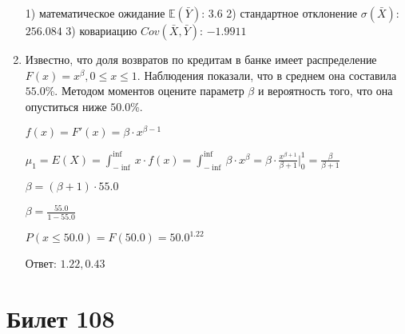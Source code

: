 \documentclass[a4paper,12pt]{article}
\begin{document}
\begin{enumerate}
1) математическое ожидание $\mathbb{E}(\bar Y)$: $3.6$ 
2) стандартное отклонение $\sigma(\bar X)$: $256.084$
3) ковариацию $Cov(\bar X, \bar Y)$: $-1.9911$


\item

    
	Известно, что доля возвратов по кредитам в банке имеет распределение $F(x) = x^{\beta}, 0 \le x \le 1$. Наблюдения показали, что в среднем она составила $55.0$\%. Методом моментов оцените параметр $\beta$ и вероятность того, что она опуститься ниже $50.0$\%.
	


	

	$f(x) = F'(x) = \beta \cdot x^{\beta - 1}$

	$\mu_{1} = E(X) = \int_{-\inf}^{\inf}x \cdot f(x) = \int_{-\inf}^{\inf} \beta \cdot x^{\beta} = \beta \cdot \frac{x^{\beta + 1}}{\beta + 1}\bigg|_0^1 = \frac{\beta}{\beta + 1}$

	$\beta = (\beta + 1) \cdot 55.0$

	$\beta = \frac{55.0}{1 - 55.0}$

	$ P(x \le 50.0) = F(50.0) = 50.0^{1.22} $

    Ответ: $1.22, 0.43$
	


\end{enumerate}

\section{Билет 108}
\end{document}
